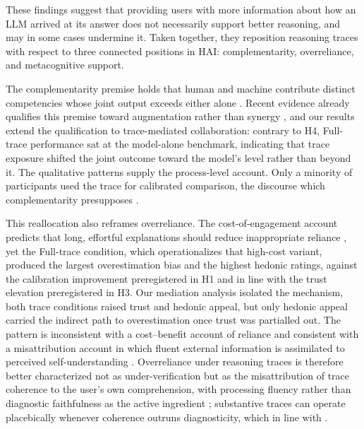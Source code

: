 \documentclass[acmlarge,review=true, anonymous=true]{acmart}
\begin{document}
These findings suggest that providing users with more information about how an LLM  arrived at its answer does not necessarily support better reasoning, and may in some cases undermine it. Taken together, they reposition reasoning traces with respect to three connected positions in HAI: complementarity, overreliance, and metacognitive support.

The complementarity premise holds that human and machine contribute distinct competencies whose joint output exceeds either alone \cite{vaccaro2024combinations}. Recent evidence already qualifies this premise toward augmentation rather than synergy \cite{vaccaro2024combinations,FERNANDES2026108779}, and our results extend the qualification to trace-mediated collaboration: contrary to H4, Full-trace performance sat at the model-alone benchmark, indicating that trace exposure shifted the joint outcome toward the model's level rather than beyond it. The qualitative patterns supply the process-level account. Only a minority of participants used the trace for calibrated comparison, the discourse which complementarity presupposes \cite{FERNANDES2026108779}.

This reallocation also reframes overreliance. The cost-of-engagement account predicts that long, effortful explanations should reduce inappropriate reliance \cite{vasconcelos2023explanations}, yet the Full-trace condition, which operationalizes that high-cost variant, produced the largest overestimation bias and the highest hedonic ratings, against the calibration improvement preregistered in H1 and in line with the trust elevation preregistered in H3. Our mediation analysis isolated the mechanism, both trace conditions raised trust and hedonic appeal, but only hedonic appeal carried the indirect path to overestimation once trust was partialled out. The pattern is inconsistent with a cost--benefit account of reliance and consistent with a misattribution account in which fluent external information is assimilated to perceived self-understanding \cite{}. Overreliance under reasoning traces is therefore better characterized not as under-verification but as the misattribution of trace coherence to the user's own comprehension, with processing fluency rather than diagnostic faithfulness as the active ingredient \cite{}; substantive traces can operate placebically whenever coherence outruns diagnosticity, which in line with \citet{eiband2019impact}.
\end{document}
